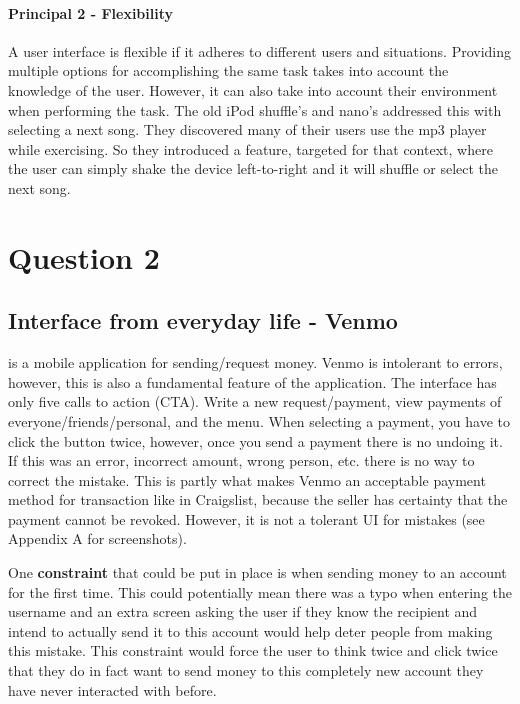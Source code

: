 \paragraph{Principal 2 - Flexibility}
A user interface is flexible if it adheres to different users and situations. Providing multiple options for accomplishing the same task takes into account the knowledge of the user. However, it can also take into account their environment when performing the task. The old iPod shuffle's and nano's addressed this with selecting a next song. They discovered many of their users use the mp3 player while exercising. So they introduced a feature, targeted for that context, where the user can simply shake the device left-to-right and it will shuffle or select the next song.

\section{Question 2}

\subsection{Interface from everyday life - Venmo}
 is a mobile application for sending/request money. Venmo is intolerant to errors, however, this is also a fundamental feature of the application. The interface has only five calls to action (CTA). Write a new request/payment, view payments of everyone/friends/personal, and the menu. When selecting a payment, you have to click the button twice, however, once you send a payment there is no undoing it. If this was an error, incorrect amount, wrong person, etc. there is no way to correct the mistake. This is partly what makes Venmo an acceptable payment method for transaction like in Craigslist, because the seller has certainty that the payment cannot be revoked. However, it is not a tolerant UI for mistakes (see Appendix A for screenshots).

One \textbf{constraint} that could be put in place is when sending money to an account for the first time. This could potentially mean there was a typo when entering the username and an extra screen asking the user if they know the recipient and intend to actually send it to this account would help deter people from making this mistake. This constraint would force the user to think twice and click twice that they do in fact want to send money to this completely new account they have never interacted with before.

